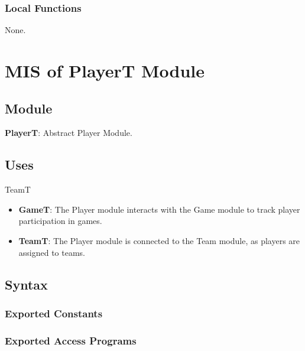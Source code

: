 \documentclass[12pt, titlepage]{article}
\begin{document}
\subsubsection{Local Functions}
None.


\newpage

\section{MIS of PlayerT Module} \label{PlayerTModule}

\subsection{Module}
\textbf{PlayerT}: Abstract Player Module.
\subsection{Uses}
TeamT
\begin{itemize}
  \item \textbf{GameT}: The Player module interacts with the Game module to track player participation in games.
  \item \textbf{TeamT}: The Player module is connected to the Team module, as players are assigned to teams.
\end{itemize}

\subsection{Syntax}

\subsubsection{Exported Constants}

\subsubsection{Exported Access Programs}
\end{document}
